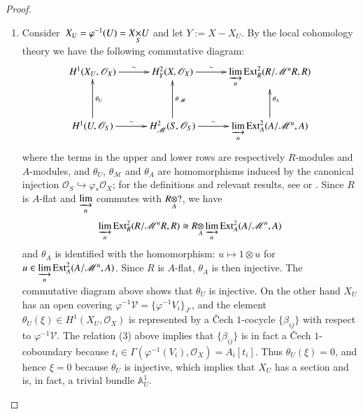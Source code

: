 \begin{proof}
\begin{enumerate}
\item Consider\pageoriginale\ $X_{U}=\varphi^{-1}(U)=\fprod{X}{U}{S}$
  and let $Y:=X-X_{U}$. By the local cohomology theory we have the
  following commutative diagram:
\[
\xymatrix@C=1cm@R=1cm{
H^{1}(X_{U},\mathscr{O}_{X})\ar[r]^-{\sim} &
H^{2}_{Y}(X,\mathscr{O}_{X})\ar[r]^-{\sim}
&{\displaystyle{\mathop{\varinjlim}_{n}}}\Ext^{2}_{R}(R/\mathscr{M}^{n}R,R)\\
H^{1}(U,\mathscr{O}_{S})\ar[u]_{\theta_{U}}\ar[r]^-{\sim} &
H^{2}_{\mathscr{M}}(S,\mathscr{O}_{S})\ar[u]_{\theta_{\mathscr{M}}}\ar[r]^-{\sim}
& {\displaystyle{\mathop{\varinjlim_{n}}}}\Ext^{2}_{A}(A/\mathscr{M}^{n},A)\ar[u]_{\theta_{A}}
}
\]
where the terms in the upper and lower rows are respectively
$R$-modules and $A$-modules, and $\theta_{U}$, $\theta_{\mathscr{M}}$
and $\theta_{A}$ are homomorphisms induced by the canonical injection
$\mathscr{O}_{S}\hookrightarrow \varphi_{\ast}\mathscr{O}_{X}$; for
the definitions and relevant results, see \cite{19} or
\cite{20}. Since $R$ is $A$-flat and
${\displaystyle{\mathop{\varinjlim}_{n}}}$ commutes with 
$\foprod{R}{?}{A}$, we have 
$$
\varinjlim_{n}\Ext^{2}_{R}(R/\mathscr{M}^{n}R,R)\cong
\foprod{R}{\varinjlim_{n}}{A}\Ext^{2}_{A}(A/\mathscr{M}^{n},A) 
$$
and $\theta_{A}$ is identified with the homomorphism: $u\mapsto
1\otimes u$ for $u\in
{\displaystyle{\mathop{\varinjlim}_{n}}}\operatorname{Ext}^{2}_{A}(A/\mathscr{M}^{n},A)$. Since
$R$ is $A$-flat, $\theta_{A}$ is then injective. The commutative
diagram above shows that $\theta_{U}$ is injective. On the other hand
$X_{U}$ has an open covering
$\varphi^{-1}\mathscr{V}=\{\varphi^{-1}V_{i}\}_{J'}$, and the element
$\theta_{U}(\xi)\in H^{1}(X_{U},\mathscr{O}_{X})$ is represented by a
\v{C}ech $1$-cocycle $\{\beta_{ij}\}$ with respect to
$\varphi^{-1}\mathscr{V}$. The relation (3) above implies that
$\{\beta_{ij}\}$ is in fact a \v{C}ech $1$-coboundary because
$t_{i}\in
\Gamma(\varphi^{-1}(V_{i}),\mathscr{O}_{X})=A_{i}[t_{i}]$. Thus
$\theta_{U}(\xi)=0$, and hence $\xi=0$ because $\theta_{U}$ is
injective, which implies that $X_{U}$ has a section and is, in fact, a
trivial bundle $\mathbb{A}^{1}_{U}$.


\end{enumerate}
\end{proof}
